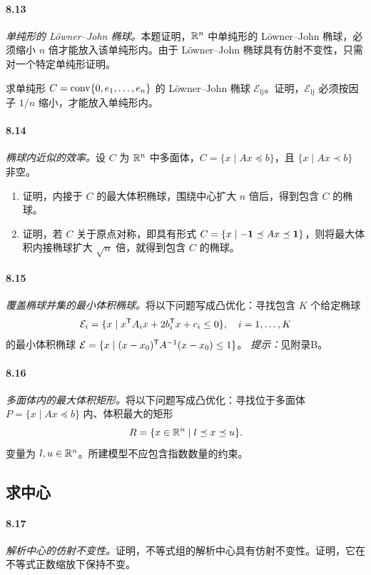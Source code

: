 \paragraph{8.13}\textit{单纯形的 Löwner--John 椭球。}本题证明，$\mathbb R^n$ 中单纯形的 Löwner--John 椭球，必须缩小 $n$ 倍才能放入该单纯形内。由于 Löwner--John 椭球具有仿射不变性，只需对一个特定单纯形证明。

求单纯形 $C=\operatorname{conv}\{0,e_1,\ldots,e_n\}$ 的 Löwner--John 椭球 $\mathcal E_{\mathrm{lj}}$。证明，$\mathcal E_{\mathrm{lj}}$ 必须按因子 $1/n$ 缩小，才能放入单纯形内。
\paragraph{8.14}\textit{椭球内近似的效率。}设 $C$ 为 $\mathbb R^n$ 中多面体，$C=\{x\mid Ax\preceq b\}$，且 $\{x\mid Ax\prec b\}$ 非空。
\begin{enumerate}[label=(\alph*)]
\item 证明，内接于 $C$ 的最大体积椭球，围绕中心扩大 $n$ 倍后，得到包含 $C$ 的椭球。
\item 证明，若 $C$ 关于原点对称，即具有形式 $C=\{x\mid-\mathbf 1\preceq Ax\preceq\mathbf 1\}$，则将最大体积内接椭球扩大 $\sqrt n$ 倍，就得到包含 $C$ 的椭球。
\end{enumerate}
\paragraph{8.15}\textit{覆盖椭球并集的最小体积椭球。}将以下问题写成凸优化：寻找包含 $K$ 个给定椭球
\[\mathcal E_i=\{x\mid x^\mathsf T A_ix+2b_i^\mathsf T x+c_i\leq0\},\quad i=1,\ldots,K\]
的最小体积椭球 $\mathcal E=\{x\mid(x-x_0)^\mathsf T A^{-1}(x-x_0)\leq1\}$。
\textit{提示：}见附录B。
\paragraph{8.16}\textit{多面体内的最大体积矩形。}将以下问题写成凸优化：寻找位于多面体 $P=\{x\mid Ax\preceq b\}$ 内、体积最大的矩形
\[R=\{x\in\mathbb R^n\mid l\preceq x\preceq u\}.\]
变量为 $l,u\in\mathbb R^n$。所建模型不应包含指数数量的约束。
\subsection*{求中心}
\paragraph{8.17}\textit{解析中心的仿射不变性。}证明，不等式组的解析中心具有仿射不变性。证明，它在不等式正数缩放下保持不变。
